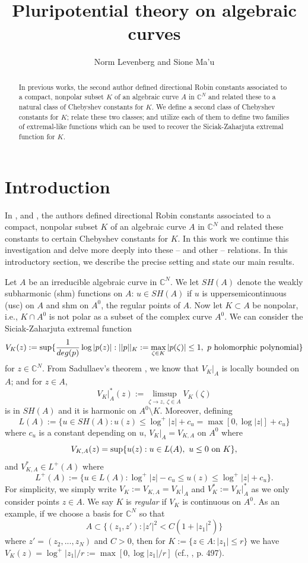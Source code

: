 \documentclass[12pt]{article}
\numberwithin{equation}{section}
\newcommand{\C}{\mathbb{C}}
\begin{document}
 
\title{Pluripotential theory on algebraic curves}
\author{Norm Levenberg and Sione Ma'u}
%
\maketitle 
\begin{abstract} In previous works, the second author defined directional Robin constants associated to a compact, nonpolar subset $K$ of an algebraic curve $A$ in $\C^N$ and related these to a natural class of Chebyshev constants for $K$. We define a second class of Chebyshev constants for $K$; relate these two classes; and utilize each of them to define two families of extremal-like functions which can be used to recover the Siciak-Zaharjuta extremal function for $K$.

\end{abstract}


\section{Introduction} In \cite{BM}, \cite{HM} and \cite{M}, the authors defined directional Robin constants associated to a compact, nonpolar subset $K$ of an algebraic curve $A$ in $\C^N$ and related these constants to certain Chebyshev constants for $K$. In this work we continue this investigation and delve more deeply into these -- and other -- relations. In this introductory section, we describe the precise setting and state our main results. 

Let $A$ be an irreducible algebraic curve in $\C^N$. We let  $SH(A)$ denote the weakly subharmonic (shm) functions on $A$: $u\in SH(A)$ if $u$ is uppersemicontinuous (usc) on $A$ and shm on $A^0$, the regular points of $A$. Now let $K\subset A$ be nonpolar, i.e., $K\cap A^0$ is not polar as a subset of the complex curve $A^0$. We can consider the Siciak-Zaharjuta extremal function 
$$V_K(z):=\sup \{\frac{1}{deg(p)}\log |p(z)|: ||p||_K:=\max_{\zeta \in K}|p(\zeta)| \leq 1, \ p \ \hbox{holomorphic polynomial}\}$$
for $z\in \C^N$. 
From Sadullaev's theorem \cite{S}, we know that 
$V_K|_A$ is locally bounded on $A$; and for $z\in A$, 
$$V_K|_A^*(z):=\limsup_{\zeta \to z, \ \zeta \in A}V_K(\zeta)$$
is in $SH(A)$ and it is harmonic on $A^0\setminus K$. Moreover, defining 
$$L(A):=\{u \in SH(A): u(z) \leq \log^+|z|+c_u=\max[0,\log |z|]+c_u\}$$
where $c_u$ is a constant depending on $u$, $V_K|_A=V_{K,A}$ on $A^0$ where
$$V_{K,A}(z)=\sup \{u(z): u\in L(A), \ u\leq 0 \ \hbox{on} \ K\},$$
and $V_{K,A}^*\in L^+(A)$ where 
$$L^+(A):=\{u \in L(A): \log^+|z|-c_u \leq u(z) \leq \log^+|z|+c_u\}.$$
For simplicity, we simply write $V_K:=V_{K,A}=V_K|_A$ and $V_K^*:=V_K|_A^*$ as we only consider points $z\in A$. We say $K$ is {\it regular} if $V_K$ is continuous on $A^0$. As an example, if we choose a basis for $\C^N$ so that 
$$A\subset \{(z_1,z'): |z'|^2  < C(1+|z_1|^2)\}$$
where $z'=(z_2,...,z_{N})$ and $C>0$, then for $K:=\{z\in A: |z_1|\leq r\}$ we have $V_K(z)=\log^+|z_1|/r:=\max[0,\log |z_1|/r]$ (cf., \cite{S}, p. 497). 
\end{document}
